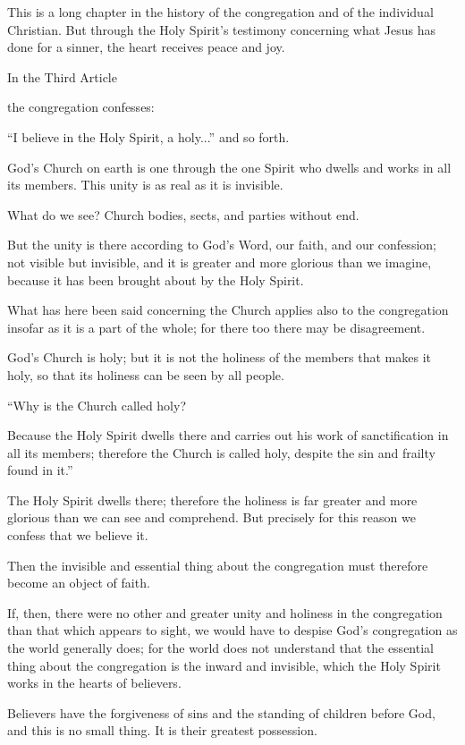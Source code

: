 This is a long chapter in the history of the congregation and of the individual Christian. But through the Holy Spirit’s testimony concerning what Jesus has done for a sinner, the heart receives peace and joy.

In the Third Article

the congregation confesses:

“I believe in the Holy Spirit, a holy...” and so forth.

God’s Church on earth is one through the one Spirit who dwells and works in all its members. This unity is as real as it is invisible.

What do we see? Church bodies, sects, and parties without end.

But the unity is there according to God’s Word, our faith, and our confession; not visible but invisible, and it is greater and more glorious than we imagine, because it has been brought about by the Holy Spirit.

What has here been said concerning the Church applies also to the congregation insofar as it is a part of the whole; for there too there may be disagreement.

God’s Church is holy; but it is not the holiness of the members that makes it holy, so that its holiness can be seen by all people.

“Why is the Church called holy?

Because the Holy Spirit dwells there and carries out his work of sanctification in all its members; therefore the Church is called holy, despite the sin and frailty found in it.”

The Holy Spirit dwells there; therefore the holiness is far greater and more glorious than we can see and comprehend. But precisely for this reason we confess that we believe it.

Then the invisible and essential thing about the congregation must therefore become an object of faith.

If, then, there were no other and greater unity and holiness in the congregation than that which appears to sight, we would have to despise God’s congregation as the world generally does; for the world does not understand that the essential thing about the congregation is the inward and invisible, which the Holy Spirit works in the hearts of believers.

Believers have the forgiveness of sins and the standing of children before God, and this is no small thing. It is their greatest possession.

